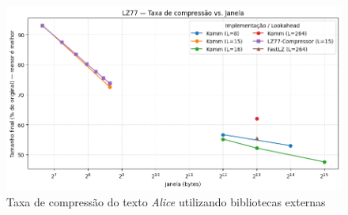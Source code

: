 \begin{figure}[h]
  \centering
  \caption{Taxa de compressão do texto \textit{Alice} utilizando bibliotecas externas}
  \label{fig:fig:external-alice-compression}
  \includegraphics[width=15cm]{figuras/lz77_alice_compression_window.png}
\end{figure}

